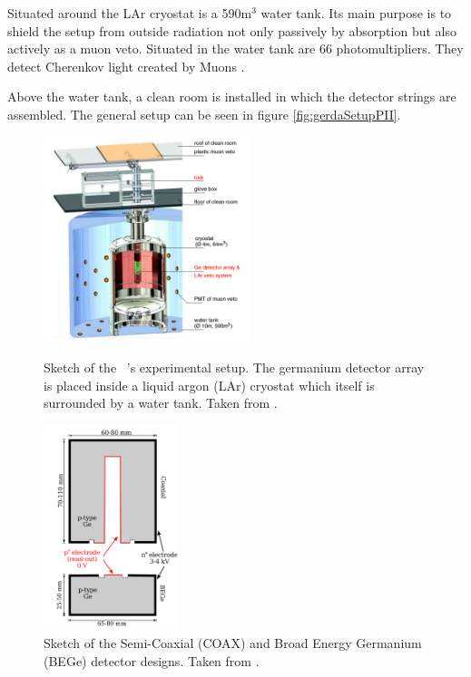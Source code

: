 \documentclass[encoding=utf8,british]{tumphthesis}
\begin{document}
Situated around the LAr cryostat is a 590m$^3$ water tank.
Its main purpose is to shield the setup from outside radiation not only passively by absorption but also actively as a muon veto.
Situated in the water tank are 66 photomultipliers.
They detect Cherenkov light created by Muons \cite{agostini_background_2017}.

Above the water tank, a clean room is installed in which the detector strings are assembled.  
The general setup can be seen in figure \ref{fig:gerdaSetupPII}.
\\

\begin{figure}[t!]
	\centering
	\begin{minipage}[t!]{.45\textwidth}
		\centering
		\includegraphics[height=60mm]{./Bilder/GERDAsetupPhaseII.png}
		\caption{Sketch of the \gerda\ \PII's experimental setup. The germanium detector array is placed inside a liquid argon (LAr) cryostat which itself is surrounded by a water tank. Taken from \cite{collaboration_upgrade_2018}.}
		\label{fig:gerdaSetupPII}
	\end{minipage}\hfill%
	\begin{minipage}[t!]{.45\textwidth}
		\centering
		\includegraphics[height=60mm]{./Bilder/DetectorDesign.png}
		\caption{Sketch of the Semi-Coaxial (COAX) and Broad Energy Germanium (BEGe) detector designs. Taken from \cite{agostini_background_2014}.}
		\label{fig:DetcDes}
	\end{minipage}
\end{figure}
\end{document}
